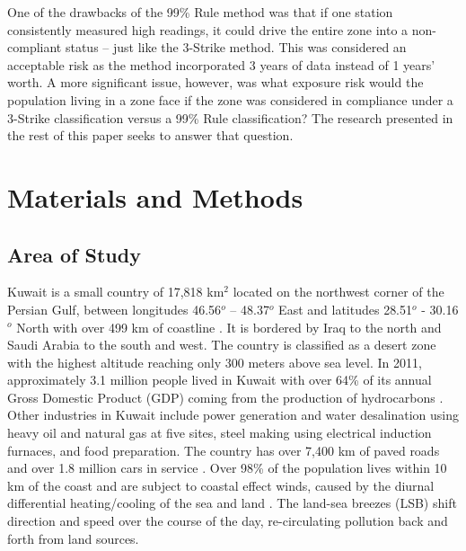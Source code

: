 One of the drawbacks of the 99\% Rule method was that if one station consistently measured high readings, it could drive the entire zone into a non-compliant status – just like the 3-Strike method. This was considered an acceptable risk as the method incorporated 3 years of data instead of 1 years’ worth. A more significant issue, however, was what exposure risk would the population living in a zone face if the zone was considered in compliance under a 3-Strike classification versus a 99\% Rule classification? The research presented in the rest of this paper seeks to answer that question.

\section{Materials and Methods}

\subsection{Area of Study}
Kuwait is a small country of 17,818 km$^{2}$ located on the northwest corner of the Persian Gulf, between longitudes 46.56$^{o}$ – 48.37$^{o}$ East and latitudes 28.51$^{o}$ - 30.16$^{o}$ North with over 499 km of coastline \citep{CIA2015}. It is bordered by Iraq to the north and Saudi Arabia to the south and west. The country is classified as a desert zone with the highest altitude reaching only 300 meters above sea level.   In 2011, approximately 3.1 million people lived in Kuwait \citep{CSB2016} with over 64\% of its annual Gross Domestic Product (GDP) coming from the production of hydrocarbons \citep{KAMCO2013}.  Other industries in Kuwait include power generation and water desalination using heavy oil and natural gas at five sites, steel making using electrical induction furnaces, and food preparation.  The country has over 7,400 km of paved roads and over 1.8 million cars in service \citep{CSB2014}.  Over 98\% of the population lives within 10 km of the coast and are subject to coastal effect winds, caused by the diurnal differential heating/cooling of the sea and land \citep{Crosman2010, Cuxart2014}.  The land-sea breezes (LSB) shift direction and speed over the course of the day, re-circulating pollution back and forth from land sources.

